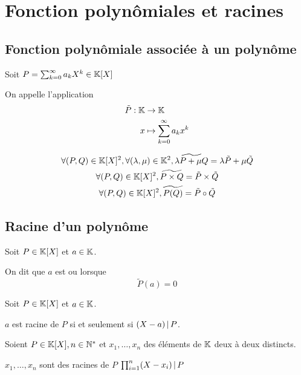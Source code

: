 \section{Fonction polynômiales et racines}

\subsection{Fonction polynômiale associée à un polynôme}

\begin{dfn}
  Soit $P = \sum^\infty_{k = 0} a_k X^k \in \mathbb{K}[X]$

  On appelle  l'application
  \begin{align*}
    \tilde{P} : \mathbb{K} &\to \mathbb{K} \\
      x &\mapsto \sum^\infty_{k = 0} a_k x^k
  \end{align*}
\end{dfn}

\begin{prp}
  \begin{gather*}
    \forall (P, Q) \in \mathbb{K}[X]^2, \forall (\lambda, \mu) \in \mathbb{K}^2,
      \widetilde{\lambda P + \mu Q} = \lambda \tilde{P} + \mu \tilde{Q} \\
    \forall (P, Q) \in \mathbb{K}[X]^2, \widetilde{P \times Q} = \tilde{P} \times \tilde{Q} \\
    \forall (P, Q) \in \mathbb{K}[X]^2, \widetilde{P(Q)} = \tilde{P} \circ \tilde{Q}
  \end{gather*}
\end{prp}

\subsection{Racine d'un polynôme}

\begin{dfn}
  Soit $P \in \mathbb{K}[X]$ et $a \in \mathbb{K}$.

  On dit que $a$ est  ou
   lorsque
  \[
    \tilde{P}(a) = 0
  \]
\end{dfn}

\begin{prp}
  Soit $P \in \mathbb{K}[X]$ et $a \in \mathbb{K}$.

  $a$ est racine de $P$ si et seulement si $(X - a) \operatorname{|} P$.
\end{prp}

\begin{cor}
  Soient $P \in \mathbb{K}[X], n \in \mathbb{N}^*$ et $x_1, \ldots, x_n$ des éléments
  de $\mathbb{K}$ deux à deux distincts.

  $x_1, \ldots, x_n$ sont des racines de $P$ \ssi $\prod^n_{i = 1} (X - x_i) \operatorname{|} P$
\end{cor}

